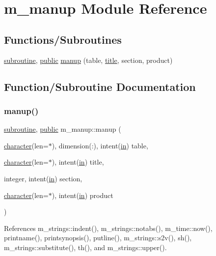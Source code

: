 \hypertarget{namespacem__manup}{}\section{m\+\_\+manup Module Reference}
\label{namespacem__manup}
\subsection*{Functions/\+Subroutines}
\begin{DoxyCompactItemize}
\item 
\hyperlink{M__stopwatch_83_8txt_acfbcff50169d691ff02d4a123ed70482}{subroutine}, \hyperlink{M__stopwatch_83_8txt_a2f74811300c361e53b430611a7d1769f}{public} \hyperlink{namespacem__manup_a2d0a043fa0f6b2ca01e2eb4747ef4bbd}{manup} (table, \hyperlink{print__watch_83_8txt_a15b5bd21156bb9fca6a755ab8c029a9c}{title}, section, product)
\end{DoxyCompactItemize}


\subsection{Function/\+Subroutine Documentation}
\mbox{\label{namespacem__manup_a2d0a043fa0f6b2ca01e2eb4747ef4bbd}} 
\subsubsection{\texorpdfstring{manup()}{manup()}}
{\footnotesize\ttfamily \hyperlink{M__stopwatch_83_8txt_acfbcff50169d691ff02d4a123ed70482}{subroutine}, \hyperlink{M__stopwatch_83_8txt_a2f74811300c361e53b430611a7d1769f}{public} m\+\_\+manup\+::manup (\begin{DoxyParamCaption}\item[{\hyperlink{option__stopwatch_83_8txt_abd4b21fbbd175834027b5224bfe97e66}{character}(len=$\ast$), dimension(\+:), intent(\hyperlink{M__journal_83_8txt_afce72651d1eed785a2132bee863b2f38}{in})}]{table,  }\item[{\hyperlink{option__stopwatch_83_8txt_abd4b21fbbd175834027b5224bfe97e66}{character}(len=$\ast$), intent(\hyperlink{M__journal_83_8txt_afce72651d1eed785a2132bee863b2f38}{in})}]{title,  }\item[{integer, intent(\hyperlink{M__journal_83_8txt_afce72651d1eed785a2132bee863b2f38}{in})}]{section,  }\item[{\hyperlink{option__stopwatch_83_8txt_abd4b21fbbd175834027b5224bfe97e66}{character}(len=$\ast$), intent(\hyperlink{M__journal_83_8txt_afce72651d1eed785a2132bee863b2f38}{in})}]{product }\end{DoxyParamCaption})}



References m\+\_\+strings\+::indent(), m\+\_\+strings\+::notabs(), m\+\_\+time\+::now(), printname(), printsynopsis(), putline(), m\+\_\+strings\+::s2v(), sh(), m\+\_\+strings\+::substitute(), th(), and m\+\_\+strings\+::upper().

